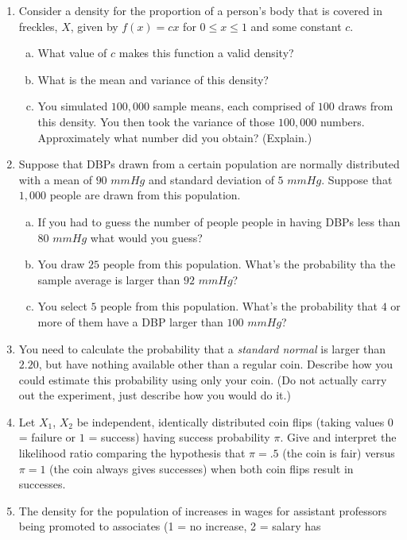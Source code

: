\documentclass[12pt]{article}
\begin{document}
\begin{enumerate}[1.]
\begin{enumerate}[1.]
\item Consider a density for the proportion of a person's body that is
  covered in freckles, $X$, given by $f(x) = cx$ for $0 \leq x \leq 1$
  and some constant $c$.
  \begin{enumerate}[a.]
  \item What value of $c$ makes this function a valid density? 
  \item What is the mean and variance of this density?
  \item You simulated $100,000$ sample means, each comprised of $100$
    draws from this density. You then took the variance of those
    $100,000$ numbers. Approximately what number did you obtain?
    (Explain.)
  \end{enumerate}
\item Suppose that DBPs drawn from a certain population are normally
    distributed with a mean of $90$ $mmHg$ and standard deviation of $5$
    $mmHg$. Suppose that $1,000$ people are drawn from this population.
  \begin{enumerate}[a.]
  \item If you had to guess the number of people people in having DBPs
    less than $80$ $mmHg$ what would you guess?
  \item  You draw
    $25$ people from this population. What's the probability tha the
    sample average is larger than $92$ $mmHg$? 
  \item  You select $5$
    people from this population. What's the probability that $4$ or
    more of them have a DBP larger than $100$ $mmHg$? 
  \end{enumerate}
\item You need to calculate the probability that a {\em standard normal} is 
  larger than $2.20$, but have nothing available other than a regular coin.
  Describe how you could estimate this probability using only your coin. (Do not
  actually carry out the experiment, just describe how you would do it.)
\item Let $X_1$, $X_2$ be independent, identically distributed coin
  flips (taking values $0$ = failure or $1$ = success) having success
  probability $\pi$. Give and interpret the likelihood ratio comparing
  the hypothesis that $\pi = .5$ (the coin is fair) versus $\pi = 1$ (the
  coin always gives successes) when both coin flips result in
  successes.
\item The density for the population of increases in wages for
assistant professors being promoted to associates (1 = no increase, 2 = salary has

\end{enumerate}
\end{enumerate}
\end{document}
